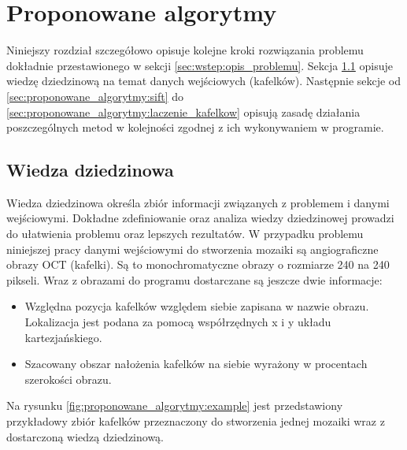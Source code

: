%
\chapter{Proponowane algorytmy}
\label{sec:proponowane_algorytmy}

Niniejszy rozdział szczegółowo opisuje kolejne kroki rozwiązania problemu dokładnie przestawionego w sekcji \ref{sec:wstep:opis_problemu}. Sekcja \ref{sec:proponowane_algorytmy:wiedza_dziedzinowa} opisuje wiedzę dziedzinową na temat danych wejściowych (kafelków). Następnie sekcje od \ref{sec:proponowane_algorytmy:sift} do \ref{sec:proponowane_algorytmy:laczenie_kafelkow} opisują zasadę działania poszczególnych metod w kolejności zgodnej z ich wykonywaniem w programie.

\section{Wiedza dziedzinowa}
\label{sec:proponowane_algorytmy:wiedza_dziedzinowa}

Wiedza dziedzinowa określa zbiór informacji związanych z problemem i danymi wejściowymi. Dokładne zdefiniowanie oraz analiza wiedzy dziedzinowej prowadzi do ułatwienia problemu oraz lepszych rezultatów. W przypadku problemu niniejszej pracy danymi wejściowymi do stworzenia mozaiki są angiograficzne obrazy OCT (kafelki). Są to monochromatyczne obrazy o rozmiarze 240 na 240 pikseli. Wraz z obrazami do programu dostarczane są jeszcze dwie informacje:

\begin{itemize}
\item Względna pozycja kafelków względem siebie zapisana w nazwie obrazu. Lokalizacja jest podana za pomocą współrzędnych x i y układu kartezjańskiego.
\item Szacowany obszar nałożenia kafelków na siebie wyrażony w procentach szerokości obrazu.
\end{itemize}

Na rysunku \ref{fig:proponowane_algorytmy:example} jest przedstawiony przykładowy zbiór kafelków przeznaczony do stworzenia jednej mozaiki wraz z dostarczoną wiedzą dziedzinową.

